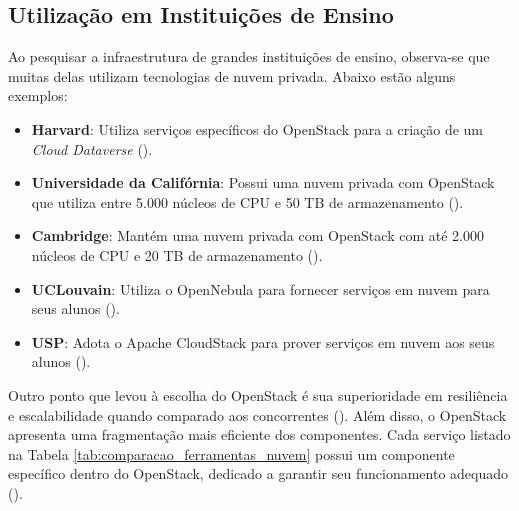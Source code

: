 \subsection{Utilização em Instituições de Ensino}

Ao pesquisar a infraestrutura de grandes instituições de ensino, observa-se que muitas delas utilizam tecnologias de nuvem privada. Abaixo estão alguns exemplos:

\begin{itemize}
    \item \textbf{Harvard}: Utiliza serviços específicos do OpenStack para a criação de um \textit{Cloud Dataverse} (\cite{CloudDataverseSwiftHarvard}).
    \item \textbf{Universidade da Califórnia}: Possui uma nuvem privada com OpenStack que utiliza entre 5.000 núcleos de CPU e 50 TB de armazenamento (\cite{UniversitiesUsingOpenStackOpenMetal}).
    \item \textbf{Cambridge}: Mantém uma nuvem privada com OpenStack com até 2.000 núcleos de CPU e 20 TB de armazenamento (\cite{UniversitiesUsingOpenStackOpenMetal}).
    \item \textbf{UCLouvain}: Utiliza o OpenNebula para fornecer serviços em nuvem para seus alunos (\cite{UCLouvainOpenNebula}).
    \item \textbf{USP}: Adota o Apache CloudStack para prover serviços em nuvem aos seus alunos (\cite{USPCloudStack}).
\end{itemize}

Outro ponto que levou à escolha do OpenStack é sua superioridade em resiliência e escalabilidade quando comparado aos concorrentes (\cite{vogel2016private}). Além disso, o OpenStack apresenta uma fragmentação mais eficiente dos componentes. Cada serviço listado na Tabela \ref{tab:comparacao_ferramentas_nuvem} possui um componente específico dentro do OpenStack, dedicado a garantir seu funcionamento adequado (\cite{vogel2016private}).
